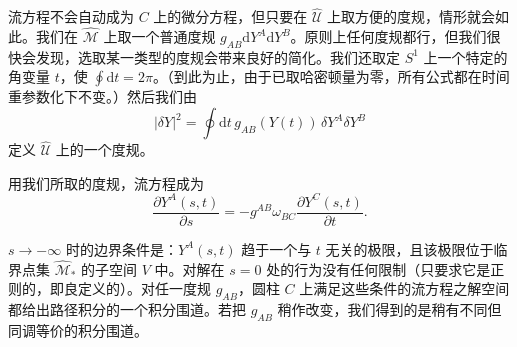 \documentclass[11pt,a4paper,UTF8]{ctexart}
\theoremstyle{plain}
\theoremstyle{definition}
\begin{document}

流方程不会自动成为 $C$ 上的微分方程，但只要在 $\widehat{\mathcal U}$ 上取方便的度规，情形就会如此。我们在 $\widehat{\mathcal M}$ 上取一个普通度规 $g_{AB}\mathrm{d}Y^A\mathrm{d}Y^B$。原则上任何度规都行，但我们很快会发现，选取某一类型的度规会带来良好的简化。我们还取定 $S^1$ 上一个特定的角变量 $t$，使 $\oint\mathrm{d}t=2\pi$。（到此为止，由于已取哈密顿量为零，所有公式都在时间重参数化下不变。）然后我们由
\begin{equation}
    |\delta Y|^2=\oint\mathrm{d}t\,g_{AB}(Y(t))\,\delta Y^A\delta Y^B
    \tag{2.36}
\end{equation}
定义 $\widehat{\mathcal U}$ 上的一个度规。

用我们所取的度规，流方程成为
\begin{equation}
    \frac{\partial Y^A(s,t)}{\partial s}
    =-g^{AB}\omega_{BC}\frac{\partial Y^C(s,t)}{\partial t}.
    \tag{2.37}
\end{equation}



$s\to-\infty$ 时的边界条件是：$Y^A(s,t)$ 趋于一个与 $t$ 无关的极限，且该极限位于临界点集 $\widehat{\mathcal M}_*$ 的子空间 $V$ 中。对解在 $s=0$ 处的行为没有任何限制（只要求它是正则的，即良定义的）。对任一度规 $g_{AB}$，圆柱 $C$ 上满足这些条件的流方程之解空间都给出路径积分的一个积分围道。若把 $g_{AB}$ 稍作改变，我们得到的是稍有不同但同调等价的积分围道。
\end{document}
